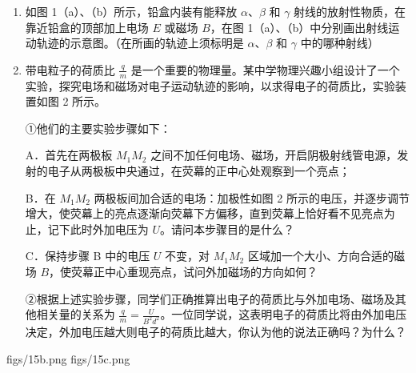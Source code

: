 \documentclass[\gkver]{gaokaozhenti}
\begin{document}
\begin{enumerate}
\begin{enumerate}
	$\ce{^{210}_{84}Po -> ^{206}_{82}Pb + X_{1}}$，$\ce{^{60}_{27}Co -> ^{60}_{28}Ni + X_{2}}$。

	方程中的 $X_{1}$ 代表的是 ，$X_{2}$ 代表的是 。

	\item
	如图 1（a）、（b）所示，铅盒内装有能释放 $\alpha$、$\beta$ 和 $\gamma$ 射线的放射性物质，在靠近铅盒的顶部加上电场 $E$ 或磁场 $B$，在图 1（a）、（b）中分别画出射线运动轨迹的示意图。（在所画的轨迹上须标明是 $\alpha$、$\beta$ 和 $\gamma$ 中的哪种射线）

	\item
	带电粒子的荷质比 $\frac{q}{m}$ 是一个重要的物理量。某中学物理兴趣小组设计了一个实验，探究电场和磁场对电子运动轨迹的影响，以求得电子的荷质比，实验装置如图 2 所示。

	①他们的主要实验步骤如下：

	A．首先在两极板 $M_{1}M_{2}$ 之间不加任何电场、磁场，开启阴极射线管电源，发射的电子从两极板中央通过，在荧幕的正中心处观察到一个亮点；

	B．在 $M_{1}M_{2}$ 两极板间加合适的电场：加极性如图 2 所示的电压，并逐步调节增大，使荧幕上的亮点逐渐向荧幕下方偏移，直到荧幕上恰好看不见亮点为止，记下此时外加电压为 $U$。请问本步骤目的是什么？

	C．保持步骤 B 中的电压 $U$ 不变，对 $M_{1}M_{2}$ 区域加一个大小、方向合适的磁场 $B$，使荧幕正中心重现亮点，试问外加磁场的方向如何？

	②根据上述实验步骤，同学们正确推算出电子的荷质比与外加电场、磁场及其他相关量的关系为 $\frac{q}{m}=\frac{U}{B^{2}d^{2}}$。一位同学说，这表明电子的荷质比将由外加电压决定，外加电压越大则电子的荷质比越大，你认为他的说法正确吗？为什么？

\end{enumerate}

{figs/15b.png}
{figs/15c.png}

\end{enumerate}
\end{document}
